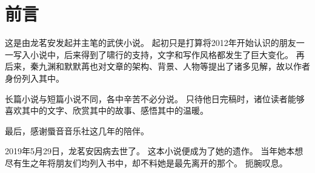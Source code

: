 \chapter*{前言}
这是由龙茗安发起并主笔的武侠小说。
起初只是打算将2012年开始认识的朋友一一写入小说中，后来得到了啸行的支持，文字和写作风格都发生了巨大变化。
再后来，秦九渊和默默苒也对文章的架构、背景、人物等提出了诸多见解，故以作者身份列入其中。

长篇小说与短篇小说不同，各中辛苦不必分说。
只待他日完稿时，诸位读者能够喜欢其中的文字、欣赏其中的故事、感悟其中的温暖。

最后，感谢蜃音音乐社这几年的陪伴。

2019年5月29日，龙茗安因病去世了。
这本小说便成为了她的遗作。
当年她本想尽有生之年将朋友们均列入书中，却不料她是最先离开的那个。
扼腕叹息。